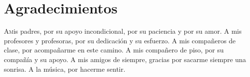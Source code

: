 \chapter*{Agradecimientos}
\pagestyle{empty}

\lettrine[lraise=-0.1, lines=2, loversize=0.25]{A} mis padres, por su apoyo incondicional, por su paciencia y por su amor.
A mis profesores y profesoras, por su dedicación y su esfuerzo.
A mis compañeros de clase, por acompañarme en este camino.
A mis compañero de piso, por su compañía y su apoyo.
A mis amigos de siempre, gracias por sacarme siempre una sonrisa.
A la música, por hacerme sentir.




{}%
\vspace{-.3cm}
{}%
{}%